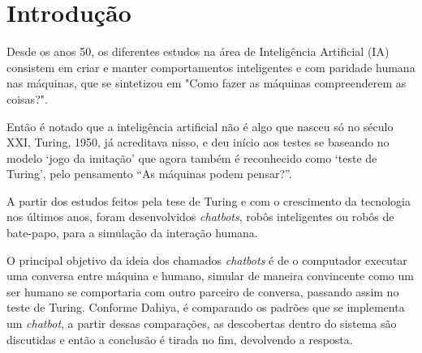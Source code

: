 \documentclass[
	12pt,				%
	oneside,
	a4paper,			%
	english,			%
	french,				%
	spanish,			%
	brazil				%
	]{abntex2}
\begin{document}

\tableofcontents*
\cleardoublepage



\textual

\chapter{Introdução}
Desde os anos 50, os diferentes estudos na área de Inteligência Artificial (IA) consistem em criar e manter comportamentos inteligentes e com paridade humana nas máquinas, que se sintetizou em "Como fazer as máquinas compreenderem as coisas?"\supercite{minsky}.

Então é notado que a inteligência artificial não é algo que nasceu só no século XXI, Turing, 1950, já acreditava nisso, e deu início aos testes se baseando no modelo ‘jogo da imitação’ que agora também é reconhecido como ‘teste de Turing’, pelo pensamento “As máquinas podem pensar?”.

A partir dos estudos feitos pela tese de Turing e com o crescimento da tecnologia nos últimos anos, foram desenvolvidos \emph{chatbots}, robôs inteligentes ou robôs de bate-papo, para a simulação da interação humana. 

O principal objetivo da ideia dos chamados \emph{chatbots} é de o computador executar uma conversa entre máquina e humano, simular de maneira convincente como um ser humano se comportaria com outro parceiro de conversa, passando assim no teste de Turing.  
Conforme Dahiya\supercite{dahiya}, é comparando os padrões que se implementa um \emph{chatbot}, a partir dessas comparações, as descobertas dentro do sistema são discutidas e então a conclusão é tirada no fim, devolvendo a resposta.
 
\end{document}
